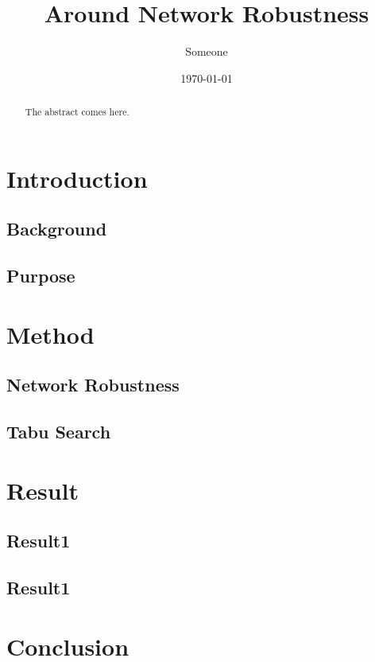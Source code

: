 \documentclass{report}
\begin{document}
\title{Around Network Robustness}
\date{\today}
\author{Someone}

\maketitle
\begin{abstract}
The abstract comes here.
\end{abstract}
\tableofcontents

\chapter{Introduction}
\section{Background}
\section{Purpose}

\chapter{Method}
\section{Network Robustness}
\section{Tabu Search}

\chapter{Result}
\section{Result1}
\section{Result1}

\chapter{Conclusion}
\end{document}
